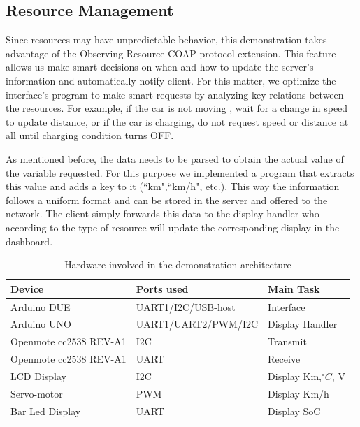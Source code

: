 \documentclass[runningheads]{llncs}
\begin{document}
\subsection{Resource Management}
	
Since resources may have unpredictable behavior, this demonstration takes
advantage of the Observing Resource COAP protocol extension. This feature allows
us make smart decisions on when and how to update the server's information and
automatically notify client.
For this matter, we optimize the interface's program to make smart requests
by analyzing key relations between the resources. For example, if the car is not
moving , wait for a change in speed to update distance, or if the car is
charging, do not request speed or distance at all until charging condition turns
OFF.

As mentioned before, the data needs to be parsed to obtain the actual value of
the variable requested. For this purpose we implemented a program that extracts
this value and adds a key to it (``km",``km/h", etc.). This way the information
follows a uniform format and can be stored in the server and offered to the
network.
The client simply forwards this data to the display handler who according to
the type of resource will update the corresponding display in the dashboard.

\begin{table}
\caption{Hardware involved in the demonstration architecture}\label{tab1}
\begin{tabular}{|l|l|l|}
\hline
Device & Ports used  &  { Main Task } \\
\hline

Arduino DUE  &  { UART1/I2C/USB-host }  &  { Interface }  \\
Arduino UNO &  { UART1/UART2/PWM/I2C } &  { Display Handler }\\
Openmote cc2538 REV-A1 & { I2C } &  { Transmit }\\
Openmote cc2538 REV-A1 & { UART } &  { Receive } \\
LCD Display & { I2C } &  { Display Km,$^{\circ}C$, V}\\
Servo-motor & { PWM }  &  { Display Km/h }\\
Bar Led Display & { UART } &  { Display SoC}  \\
\hline
\end{tabular}
\end{table}
\end{document}

